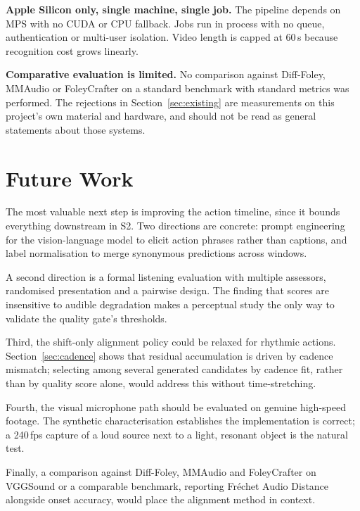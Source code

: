 \documentclass[conference]{IEEEtran}
\begin{document}
\textbf{Apple Silicon only, single machine, single job.} The pipeline depends on
MPS with no CUDA or CPU fallback. Jobs run in process with no queue,
authentication or multi-user isolation. Video length is capped at 60\,s because
recognition cost grows linearly.

\textbf{Comparative evaluation is limited.} No comparison against Diff-Foley,
MMAudio or FoleyCrafter on a standard benchmark with standard metrics was
performed. The rejections in Section~\ref{sec:existing} are measurements on this
project's own material and hardware, and should not be read as general statements
about those systems.

\section{Future Work}

The most valuable next step is improving the action timeline, since it bounds
everything downstream in S2. Two directions are concrete: prompt engineering for
the vision-language model to elicit action phrases rather than captions, and
label normalisation to merge synonymous predictions across windows.

A second direction is a formal listening evaluation with multiple assessors,
randomised presentation and a pairwise design. The finding that scores are
insensitive to audible degradation makes a perceptual study the only way to
validate the quality gate's thresholds.

Third, the shift-only alignment policy could be relaxed for rhythmic actions.
Section~\ref{sec:cadence} shows that residual accumulation is driven by cadence
mismatch; selecting among several generated candidates by cadence fit, rather than
by quality score alone, would address this without time-stretching.

Fourth, the visual microphone path should be evaluated on genuine high-speed
footage. The synthetic characterisation establishes the implementation is
correct; a 240\,fps capture of a loud source next to a light, resonant object is
the natural test.

Finally, a comparison against Diff-Foley, MMAudio and FoleyCrafter on VGGSound or
a comparable benchmark, reporting Fréchet Audio Distance alongside onset accuracy,
would place the alignment method in context.

\end{document}
